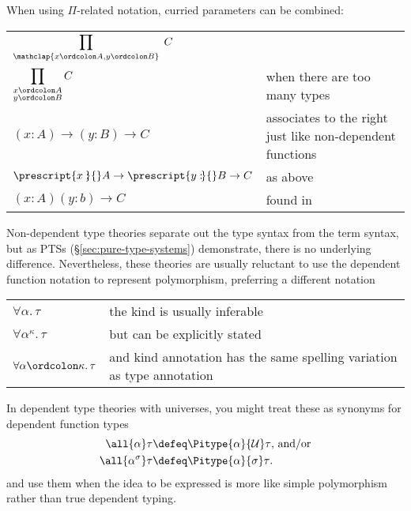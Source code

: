 \documentclass[11pt]{article} %
\theoremstyle{definition}
\theoremstyle{remark}
\begin{document}
When using $\Pi$-related notation, curried parameters can be combined:
\begin{center}
\renewcommand{\arraystretch}{1.2}
\begin{tabular}{lp{8.2cm}}
$\displaystyle\prod_{\mathclap{x \ordcolon A, y \ordcolon B}}\;C$ &  \\
$\displaystyle\prod_{\substack{x \ordcolon A \\ y \ordcolon B}}C$ & when there are too many types \\
$(x : A) \to (y : B) \to C$ & associates to the right just like non-dependent functions \\
$\prescript{x:\!\!}{}A \to \prescript{y:\!}{}B \to C$ & as above \\
$(x:A)(y:b) \to C$ & found in \cite{kaposi_2020} \\
\end{tabular}
\end{center}

Non-dependent type theories separate out the type syntax from the term syntax, but as PTSs (\S\ref{sec:pure-type-systems}) demonstrate, there is no underlying difference.
Nevertheless, these theories are usually reluctant to use the dependent function notation to represent polymorphism, preferring a different notation
\begin{center}
\renewcommand{\arraystretch}{1.2}
\begin{tabular}{lp{8.2cm}}
$\forall \alpha.\,\tau$ & the kind is usually inferable \\
$\forall \alpha^\kappa.\,\tau$ & but can be explicitly stated \\
$\forall \alpha\ordcolon\kappa.\,\tau$ & and kind annotation has the same spelling variation as type annotation \\
\end{tabular}
\end{center}
In dependent type theories with universes, you might treat these as synonyms for dependent function types
\begin{align*}
  \all{\alpha}\tau &\defeq \Pitype{\alpha}{\mathcal U}\tau \text{, and/or}\\
  \all{\alpha^\sigma}\tau &\defeq \Pitype{\alpha}{\mathcal \sigma}\tau \text{.}
\end{align*}
  and use them when the idea to be expressed is more like simple polymorphism rather than true dependent typing.
\end{document}
